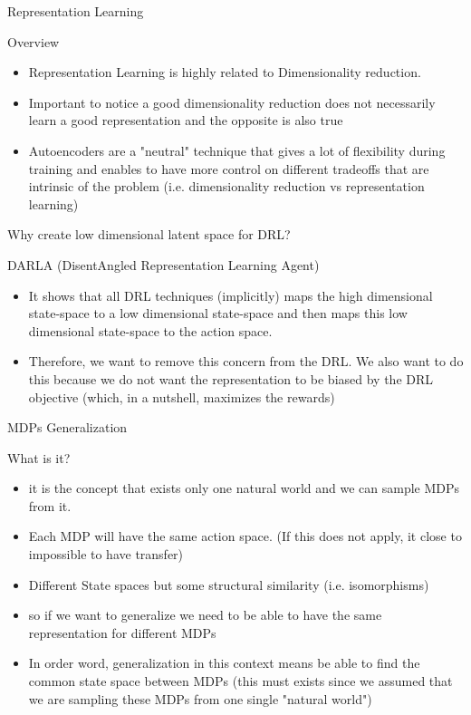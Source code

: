 \documentclass[presentation]{beamer}
\begin{document}
\begin{frame}[label={sec:orge622e24}]{Representation Learning}
\begin{block}{Overview}
\begin{itemize}
\item Representation Learning is highly related to Dimensionality reduction.
\item Important to notice a good dimensionality reduction does not
necessarily learn a good representation and the opposite is also
true
\item Autoencoders are a "neutral" technique that gives a lot of
flexibility during training and enables to have more control on
different tradeoffs that are intrinsic of the problem
(i.e. dimensionality reduction vs representation learning)
\end{itemize}
\end{block}
\end{frame}

\begin{frame}[label={sec:org1735c55}]{Why create low dimensional latent space for DRL?}
\begin{block}{DARLA (DisentAngled Representation Learning Agent)}
\begin{itemize}
\item It shows that all DRL techniques  (implicitly) maps
the high dimensional state-space to a low dimensional state-space
and then maps this low dimensional state-space to the action space.
\item Therefore, we want to remove this concern from the DRL. We also want to do
this because we do not want the representation to be biased by the
DRL objective (which, in a nutshell, maximizes the rewards)
\end{itemize}
\end{block}
\end{frame}

\begin{frame}[label={sec:org961844b}]{MDPs Generalization}
\begin{block}{What is it?}
\begin{itemize}
\item it is the concept that exists only one natural world and we can sample MDPs
from it.
\item Each MDP will have the same action space. (If this does not apply,
it close to impossible to have transfer)
\item Different State spaces but some structural similarity
(i.e. isomorphisms)
\item so if we want to generalize we need to be able to have the same
representation for different MDPs
\item In order word, generalization in this context means be able to find the
common state space between MDPs (this must exists since we assumed
that we are sampling these MDPs from one single "natural world")
\end{itemize}
\end{block}
\end{frame}
\end{document}
